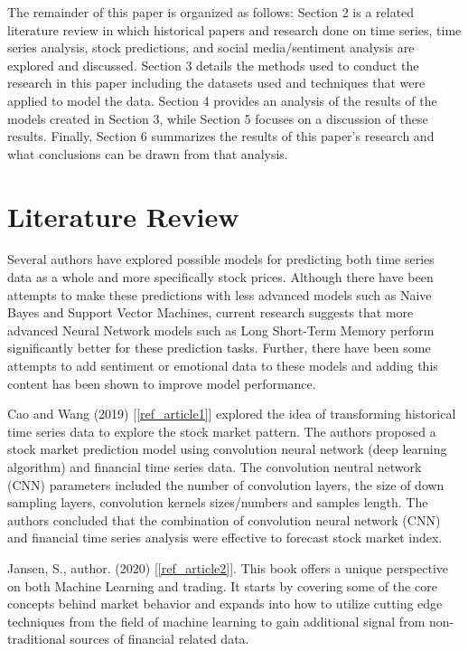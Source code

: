 \documentclass{llncs}
\begin{document}
The remainder of this paper is organized as follows: Section 2 is a related literature review in which historical papers and research done on time series, time series analysis, stock predictions, and social media/sentiment analysis are explored and discussed. Section 3 details the methods used to conduct the research in this paper including the datasets used and techniques that were applied to model the data. Section 4 provides an analysis of the results of the models created in Section 3, while Section 5 focuses on a discussion of these results. Finally, Section 6 summarizes the results of this paper's research and what conclusions can be drawn from that analysis.

\section{Literature Review}

Several authors have explored possible models for predicting both time series data as a whole and more specifically stock prices. Although there have been attempts to make these predictions with less advanced models such as Naive Bayes and Support Vector Machines, current research suggests that more advanced Neural Network models such as Long Short-Term Memory perform significantly better for these prediction tasks. Further, there have been some attempts to add sentiment or emotional data to these models and adding this content has been shown to improve model performance.

Cao and Wang (2019) [\ref{ref_article1}] explored the idea of transforming historical time series data to explore the stock market pattern. The authors proposed a stock market prediction model using convolution neural network (deep learning algorithm) and financial time series data. The convolution neutral network (CNN) parameters included the number of convolution layers, the size of down sampling layers, convolution kernels sizes/numbers and samples length. The authors concluded that the combination of convolution neural network (CNN) and financial time series analysis were effective to forecast stock market index.

Jansen, S., author. (2020) [\ref{ref_article2}].  This book offers a unique perspective on both Machine Learning and trading.  It starts by covering some of the core concepts behind market behavior and expands into how to utilize cutting edge techniques from the field of machine learning to gain additional signal from non-traditional sources of financial related data.
\end{document}
